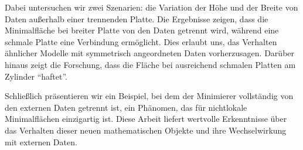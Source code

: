 Dabei untersuchen wir zwei Szenarien: die Variation der Höhe und der Breite von Daten
außerhalb einer trennenden Platte. Die Ergebnisse zeigen, dass die Minimalfläche bei
breiter Platte von den Daten getrennt wird, während eine schmale Platte eine Verbindung
ermöglicht. Dies erlaubt uns, das Verhalten ähnlicher Modelle mit symmetrisch angeordneten
Daten vorherzusagen. Darüber hinaus zeigt die Forschung, dass die Fläche bei ausreichend
schmalen Platten am Zylinder \enquote{haftet}.\newline

Schließlich präsentieren wir ein Beispiel, bei dem der Minimierer vollständig von den
externen Daten getrennt ist, ein Phänomen, das für nichtlokale Minimalflächen einzigartig
ist. Diese Arbeit liefert wertvolle Erkenntnisse über das Verhalten dieser neuen
mathematischen Objekte und ihre Wechselwirkung mit externen Daten.